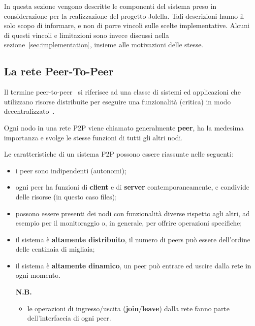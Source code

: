 
In questa sezione vengono descritte le componenti del sistema preso in
considerazione per la realizzazione del progetto Jolella. Tali descrizioni hanno
il solo scopo di informare, e non di porre vincoli sulle scelte implementative.
Alcuni di questi vincoli e limitazioni sono invece discussi nella
sezione~\ref{sec:implementation}, insieme alle motivazioni delle stesse.

\subsection{La rete Peer-To-Peer}
\label{subsec:p2p}

Il termine peer-to-peer~\cite{AS04,Balakrishnan:2003:LUD:606272.606299} si
riferisce ad una classe di sistemi ed applicazioni che utilizzano risorse
distribuite per eseguire una funzionalità (critica) in modo
decentralizzato~\cite{peer-to-peer}.

Ogni nodo in una rete P2P viene chiamato generalmente \textbf{peer}, ha la
medesima importanza e svolge le stesse funzioni di tutti gli altri nodi.

Le caratteristiche di un sistema P2P possono essere riassunte nelle seguenti:

\begin{itemize}

 \item i peer sono indipendenti (autonomi);

 \item ogni peer ha funzioni di \textbf{client} e di \textbf{server}
       contemporaneamente, e condivide delle risorse (in questo caso files);

 \item possono essere presenti dei nodi con funzionalità diverse rispetto agli
       altri, ad esempio per il monitoraggio o, in generale, per offrire operazioni
       specifiche;

 \item il sistema è \textbf{altamente distribuito}, il numero di peers può
       essere dell'ordine delle centinaia di migliaia;

 \item il sistema è \textbf{altamente dinamico}, un peer può entrare ed uscire
       dalla rete in ogni momento.

       \textbf{N.B.}

       \begin{itemize}

        \item le operazioni di ingresso/uscita (\textbf{join}/\textbf{leave}) dalla
              rete fanno parte dell'interfaccia di ogni peer.

       \end{itemize}

\end{itemize}

